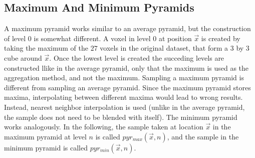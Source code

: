 \subsection{Maximum And Minimum Pyramids}
A maximum pyramid works similar to an average pyramid, but the construction of level $0$ is somewhat different. A voxel in level $0$ at position $\vec{x}$ is created by taking the maximum of the $27$ voxels in the original dataset, that form a 3 by 3 cube around $\vec{x}$. Once the lowest level is created the succeding levels are constructed llike in the average pyramid, only that the maximum is used as the aggregation method, and not the maximum. Sampling a maximum pyramid is different from sampling an average pyramid. Since the maximum pyramid stores maxima, interpolating between different maxima would lead to wrong results. Instead, nearest neighbor interpolation is used (unlike in the average pyramid, the sample does not need to be blended with itself).
The minimum pyramid works analogously.
In the following, the sample taken at location $\vec{x}$ in the maximum pyramid at level $n$ is called $pyr_{max}(\vec{x}, n)$, and the sample in the minimum pyramid is called $pyr_{min}(\vec{x}, n)$.

